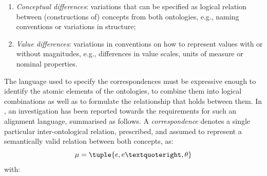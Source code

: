 \documentclass[sort&compress,preprint,authoryear,3p,twocolumn]{elsarticle}
\providecommand{\tightlist}{%
  \setlength{\itemsep}{0pt}\setlength{\parskip}{0pt}}
\begin{document}
\begin{enumerate}
\def\labelenumi{\arabic{enumi}.}
\tightlist
\item
  \emph{Conceptual differences}: variations that can be specified as
  logical relation between (constructions of) concepts from both
  ontologies, e.g., naming conventions or variations in structure;
\item
  \emph{Value differences}: variations in conventions on how to
  represent values with or without magnitudes, e.g., differences in
  value scales, units of measure or nominal properties.
\end{enumerate}

The language used to specify the correspondences must be expressive
enough to identify the atomic elements of the ontologies, to combine
them into logical combinations as well as to formulate the relationship
that holds between them. In \citep{Euzenat2007, Scharffe2011}, an
investigation has been reported towards the requirements for such an
alignment language, summarised as follows. A \emph{correspondence}
denotes a single particular inter-ontological relation, prescribed, and
assumed to represent a semantically valid relation between both
concepts, as: \begin{equation*}\label{eq:correspondence}
\mu = \tuple{ e, e’, \theta }
\end{equation*} with:
\end{document}
